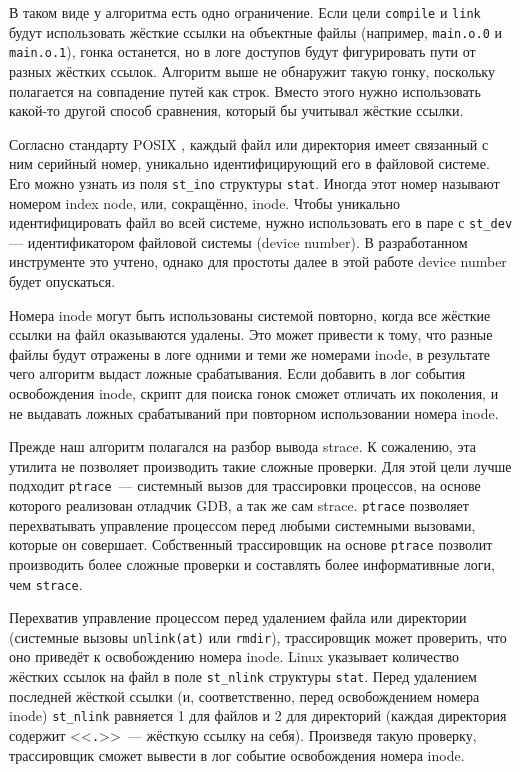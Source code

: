 В таком виде у алгоритма есть одно ограничение. Если цели \texttt{compile} и \texttt{link} будут использовать жёсткие ссылки на объектные файлы (например, \texttt{main.o.0} и \texttt{main.o.1}), гонка останется, но в логе доступов будут фигурировать пути от разных жёстких ссылок. Алгоритм выше не обнаружит такую гонку, поскольку полагается на совпадение путей как строк. Вместо этого нужно использовать какой-то другой способ сравнения, который бы учитывал жёсткие ссылки.

Согласно стандарту POSIX \cite{8277153}, каждый файл или директория имеет связанный с ним серийный номер, уникально идентифицирующий его в файловой системе. Его можно узнать из поля \texttt{st\_ino} структуры \texttt{stat}. Иногда этот номер называют номером index node, или, сокращённо, inode. Чтобы уникально идентифицировать файл во всей системе, нужно использовать его в паре с \texttt{st\_dev} --- идентификатором файловой системы (device number). В разработанном инструменте это учтено, однако для простоты далее в этой работе device number будет опускаться.

Номера inode могут быть использованы системой повторно, когда все жёсткие ссылки на файл оказываются удалены. Это может привести к тому, что разные файлы будут отражены в логе одними и теми же номерами inode, в результате чего алгоритм выдаст ложные срабатывания. Если добавить в лог события освобождения inode, скрипт для поиска гонок сможет отличать их поколения, и не выдавать ложных срабатываний при повторном использовании номера inode.

Прежде наш алгоритм полагался на разбор вывода strace. К сожалению, эта утилита не позволяет производить такие сложные проверки. Для этой цели лучше подходит \texttt{ptrace}~--- системный вызов для трассировки процессов, на основе которого реализован отладчик GDB, а так же сам strace. \texttt{ptrace} позволяет перехватывать управление процессом перед любыми системными вызовами, которые он совершает. Собственный трассировщик на основе \texttt{ptrace} позволит производить более сложные проверки и составлять более информативные логи, чем \texttt{strace}.

Перехватив управление процессом перед удалением файла или директории (системные вызовы \texttt{unlink(at)} или \texttt{rmdir}), трассировщик может проверить, что оно приведёт к освобождению номера inode. Linux указывает количество жёстких ссылок на файл в поле \texttt{st\_nlink} структуры \texttt{stat}. Перед удалением последней жёсткой ссылки (и, соответственно, перед освобождением номера inode) \texttt{st\_nlink} равняется 1 для файлов и 2 для директорий (каждая директория содержит <<\texttt{.}>>~--- жёсткую ссылку на себя). Произведя такую проверку, трассировщик сможет вывести в лог событие освобождения номера inode.

